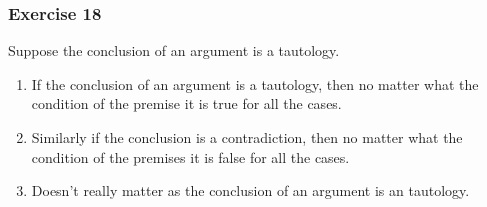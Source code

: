 
\subsubsection{Exercise 18}

    \question Suppose the conclusion of an argument is a tautology.

    \begin{solution}
        \begin{enumerate}[label=(\alph*)]
            \item If the conclusion of an argument is a tautology, then no matter what the condition of the premise it is true for all the cases.
            
            \item Similarly if the conclusion is a contradiction, then no matter what the condition of the premises it is false for all the cases.
            
            \item Doesn't really matter as the conclusion of an argument is an tautology.
        \end{enumerate}
    \end{solution}